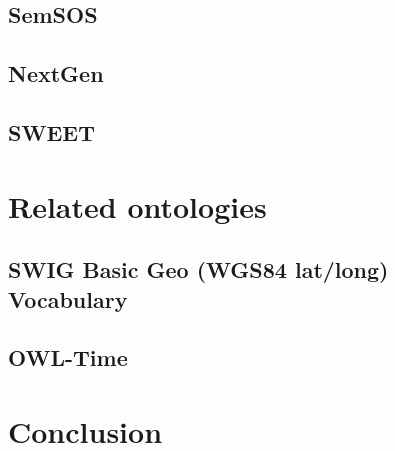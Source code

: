 
\subsection{SemSOS}


\subsection{NextGen}


\subsection{SWEET}


\section{Related ontologies}


\subsection{SWIG Basic Geo (WGS84 lat/long) Vocabulary}


\subsection{OWL-Time}



\section{Conclusion}

